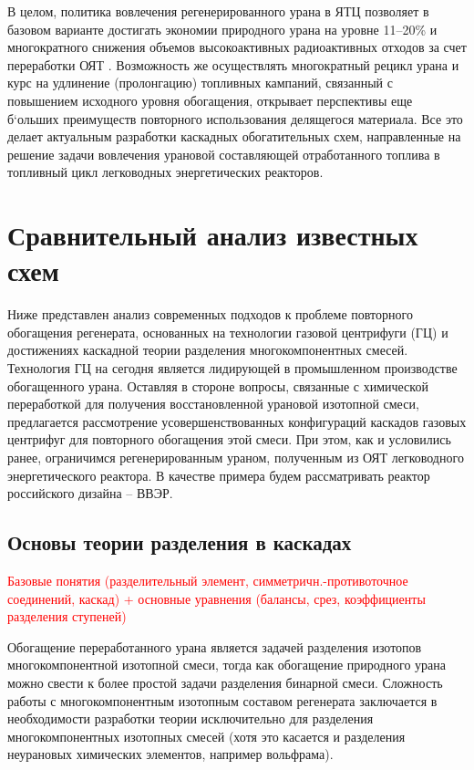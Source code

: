 В целом, политика вовлечения регенерированного урана в ЯТЦ позволяет в базовом варианте достигать экономии природного урана на уровне 11--20\% и многократного снижения объемов высокоактивных радиоактивных отходов за счет переработки ОЯТ \cite{delculAnalysisReuseUranium2009}. Возможность же осуществлять многократный рецикл урана и курс на удлинение (пролонгацию) топливных кампаний, связанный с повышением исходного уровня обогащения, открывает перспективы еще б`ольших преимуществ повторного использования делящегося материала.
Все это делает актуальным разработки каскадных обогатительных схем, направленные на решение задачи вовлечения урановой составляющей отработанного топлива в топливный цикл легководных энергетических реакторов.


\section{Сравнительный анализ известных схем}\label{sec:ch1/sec2}

Ниже представлен анализ современных подходов к проблеме повторного обогащения регенерата, основанных на технологии газовой центрифуги (ГЦ) и достижениях каскадной теории разделения многокомпонентных смесей. Технология ГЦ на сегодня является лидирующей в промышленном производстве обогащенного урана.
Оставляя в стороне вопросы, связанные с химической переработкой для получения восстановленной урановой изотопной смеси, предлагается рассмотрение усовершенствованных конфигураций каскадов газовых центрифуг для повторного обогащения этой смеси. При этом, как и условились ранее, ограничимся регенерированным ураном, полученным из ОЯТ легководного энергетического реактора. В качестве примера будем рассматривать реактор российского дизайна -- ВВЭР.

\subsection{Основы теории разделения в каскадах}\label{sec:ch1/sec2.1}

\textcolor{red}{Базовые понятия (разделительный элемент, симметричн.-противоточное соединений, каскад) + основные уравнения (балансы, срез, коэффициенты разделения ступеней)}

Обогащение переработанного урана является задачей разделения изотопов многокомпонентной изотопной смеси, тогда как обогащение природного урана можно свести к более простой задачи разделения бинарной смеси. Сложность работы с многокомпонентным изотопным составом регенерата заключается в необходимости разработки теории исключительно для разделения многокомпонентных изотопных смесей (хотя это касается и разделения неурановых химических элементов, например вольфрама).

